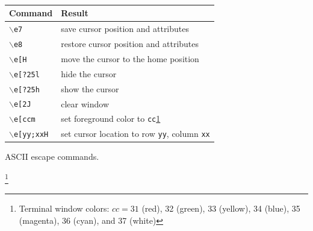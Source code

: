 \documentclass[epsfig,10pt,fullpage]{article}
\newcommand{\CommonDocsPath}{../../common/docs}
\begin{document}
\begin{table}[H]
~\\
\centering
\label{tab:vt100}
\begin{tabular}{l|l}
		  {\bf Command} & {\bf Result} \\ \hline
		  \rule{0cm}{12pt}\texttt{$\backslash$e7} & save cursor position and attributes\\
		  \texttt{$\backslash$e8} & restore cursor position and attributes\\
		  \texttt{$\backslash$e[H} & move the cursor to the home position\\
		  \texttt{$\backslash$e[?25l} & hide the cursor \\
		  \texttt{$\backslash$e[?25h} & show the cursor \\
		  \texttt{$\backslash$e[2J} & clear window \\
		  \texttt{$\backslash$e[ccm} & set foreground color to \texttt{cc}\ref{colors} \\
		  \texttt{$\backslash$e[yy;xxH} & set cursor location to row \texttt{yy}, column \texttt{xx}
\end{tabular}
\end{table}
\begin{center}ASCII escape commands.\end{center}
\footnote{\label{colors}Terminal window colors: $cc = 31$ (red), 32 (green), 33 (yellow), 
34 (blue), 35 (magenta), 36 (cyan), and 37 (white)}


\end{document}

